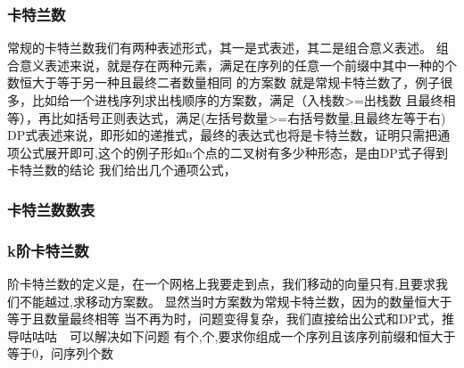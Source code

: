 \documentclass[8pt,a4paper]{article}
\newcommand{\code}[1]{
    
}
\newcommand{\txt}[1]{\par\noindent\footnotesize #1}
\newcommand{\inlineformula}[1]{\ensuremath{}}
\begin{document}
\begin{multicols}{2}
        \subsubsection{卡特兰数}
            \txt{常规的卡特兰数我们有两种表述形式，其一是\inlineformula{./assets/formulas_tex/formula_242.tex}式表述，其二是组合意义表述。
组合意义表述来说，就是存在两种元素，满足在序列的任意一个前缀中其中一种的个数恒大于等于另一种且最终二者数量相同 的方案数
就是常规卡特兰数了，例子很多，比如给一个进栈序列求出栈顺序的方案数，满足（入栈数>=出栈数 且最终相等），再比如括号正则表达式，满足(左括号数量>=右括号数量,且最终左等于右)
DP式表述来说，即形如\inlineformula{./assets/formulas_tex/formula_243.tex}的递推式，最终\inlineformula{./assets/formulas_tex/formula_244.tex}的表达式也将是卡特兰数，证明只需把通项公式展开即可,这个的例子形如n个点的二叉树有多少种形态，是由DP式子得到卡特兰数的结论
我们给出几个通项公式，\inlineformula{./assets/formulas_tex/formula_245.tex}
\inlineformula{./assets/formulas_tex/formula_246.tex}    \inlineformula{./assets/formulas_tex/formula_247.tex}}
        \subsubsection{卡特兰数数表}
            \code{src/number_theory/几个经典计数模型_6.cpp}
        \subsubsection{k阶卡特兰数}
            \txt{\inlineformula{./assets/formulas_tex/formula_248.tex}阶卡特兰数的定义是，在一个网格上我要走到\inlineformula{./assets/formulas_tex/formula_249.tex}点，我们移动的向量只有\inlineformula{./assets/formulas_tex/formula_250.tex},且要求我们不能越过\inlineformula{./assets/formulas_tex/formula_251.tex},求移动方案数。
显然当\inlineformula{./assets/formulas_tex/formula_252.tex}时方案数为常规卡特兰数，因为\inlineformula{./assets/formulas_tex/formula_253.tex}的数量恒大于等于\inlineformula{./assets/formulas_tex/formula_254.tex}且数量最终相等
当\inlineformula{./assets/formulas_tex/formula_255.tex}不再为\inlineformula{./assets/formulas_tex/formula_256.tex}时，问题变得复杂，我们直接给出公式和DP式，推导咕咕咕
\inlineformula{./assets/formulas_tex/formula_257.tex}
\inlineformula{./assets/formulas_tex/formula_258.tex}
可以解决如下问题
有\inlineformula{./assets/formulas_tex/formula_259.tex}个\inlineformula{./assets/formulas_tex/formula_260.tex},\inlineformula{./assets/formulas_tex/formula_261.tex}个\inlineformula{./assets/formulas_tex/formula_262.tex},要求你组成一个序列且该序列前缀和恒大于等于0，问序列个数}

\end{multicols}
\end{document}
